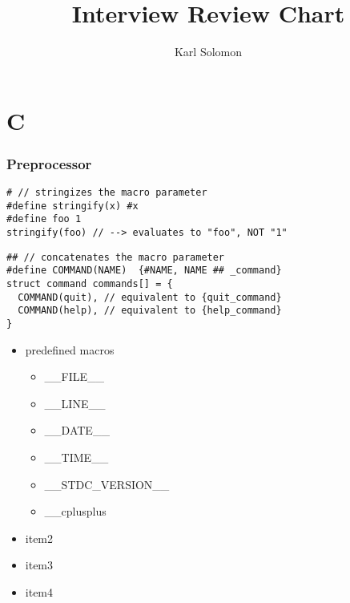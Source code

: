 \documentclass{article}
\begin{document}
\selectfont
\title{Interview Review Chart}
\author{Karl Solomon}
\maketitle
\tableofcontents
\part{C}
\section{Preprocessor}
    \begin{lstlisting}[style=cpp]
# // stringizes the macro parameter
#define stringify(x) #x
#define foo 1
stringify(foo) // --> evaluates to "foo", NOT "1"
\end{lstlisting}

    \begin{lstlisting}[style=cpp]
## // concatenates the macro parameter
#define COMMAND(NAME)  {#NAME, NAME ## _command}
struct command commands[] = {
  COMMAND(quit), // equivalent to {quit_command}
  COMMAND(help), // equivalent to {help_command}
}
\end{lstlisting}

    \begin{itemize}
      \item predefined macros
        \begin{itemize}
          \item \_\_FILE\_\_
          \item \_\_LINE\_\_
          \item \_\_DATE\_\_
          \item \_\_TIME\_\_
          \item \_\_STDC\_VERSION\_\_
          \item \_\_cplusplus
        \end{itemize}
      \item item2
      \item item3
      \item item4
    \end{itemize}
\end{document}
